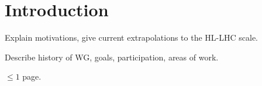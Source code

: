 \section{Introduction}

Explain motivations, give current extrapolations to the HL-LHC scale.

Describe history of WG, goals, participation, areas of work.

$\leq 1$ page.
